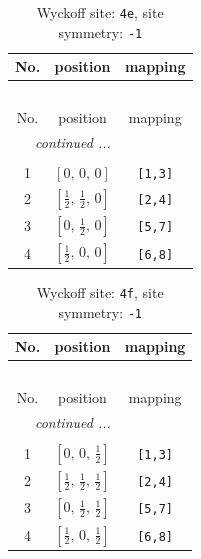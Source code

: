 \documentclass[fleqn,8pt]{jsarticle}
\begin{document}
\begin{longtable}{ccc}
\caption{Wyckoff site: {\tt 4e}, site symmetry: {\tt -1}}
 \\
 \hline \hline
No. & position & mapping \\ \hline \endfirsthead

\multicolumn{2}{l}{\tablename\ \thetable{}} \\
 \hline \hline
No. & position & mapping \\ \hline \endhead

 \hline \hline
\multicolumn{2}{r}{\footnotesize\it continued ...} \\ \endfoot

 \hline \hline
\multicolumn{2}{r}{} \\ \endlastfoot

1 & $\left[ 0,\, 0,\, 0 \right]$ & {\tt [1,3]} \\ \hline
2 & $\left[ \frac{1}{2},\, \frac{1}{2},\, 0 \right]$ & {\tt [2,4]} \\ \hline
3 & $\left[ 0,\, \frac{1}{2},\, 0 \right]$ & {\tt [5,7]} \\ \hline
4 & $\left[ \frac{1}{2},\, 0,\, 0 \right]$ & {\tt [6,8]} \\
\end{longtable}
\renewcommand{\arraystretch}{1.2}
\begin{longtable}{ccc}
\caption{Wyckoff site: {\tt 4f}, site symmetry: {\tt -1}}
 \\
 \hline \hline
No. & position & mapping \\ \hline \endfirsthead

\multicolumn{2}{l}{\tablename\ \thetable{}} \\
 \hline \hline
No. & position & mapping \\ \hline \endhead

 \hline \hline
\multicolumn{2}{r}{\footnotesize\it continued ...} \\ \endfoot

 \hline \hline
\multicolumn{2}{r}{} \\ \endlastfoot

1 & $\left[ 0,\, 0,\, \frac{1}{2} \right]$ & {\tt [1,3]} \\ \hline
2 & $\left[ \frac{1}{2},\, \frac{1}{2},\, \frac{1}{2} \right]$ & {\tt [2,4]} \\ \hline
3 & $\left[ 0,\, \frac{1}{2},\, \frac{1}{2} \right]$ & {\tt [5,7]} \\ \hline
4 & $\left[ \frac{1}{2},\, 0,\, \frac{1}{2} \right]$ & {\tt [6,8]} \\
\end{longtable}
\end{document}

